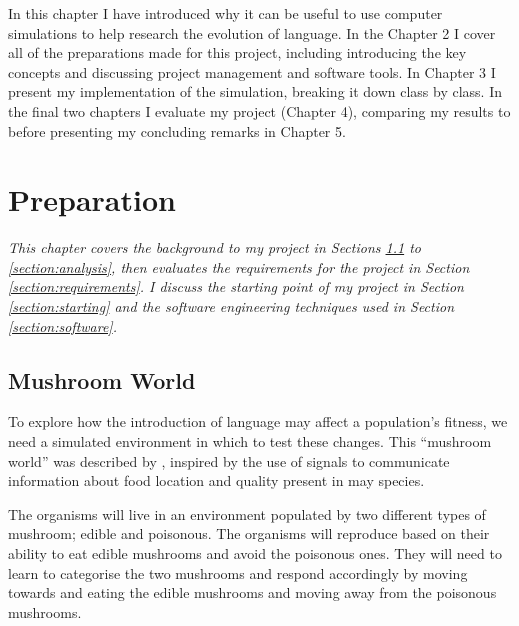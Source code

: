 \documentclass[12pt,a4paper,twoside,openright]{report}
\begin{document}
In this chapter I have introduced why it can be useful to use computer simulations to help research the evolution of language. In the Chapter 2 I cover all of the preparations made for this project, including introducing the key concepts and discussing project management and software tools. In Chapter 3 I present my implementation of the simulation, breaking it down class by class. In the final two chapters I evaluate my project (Chapter 4), comparing my results to \citet{Cangelosi1998} before presenting my concluding remarks in Chapter 5. 


\chapter{Preparation}\label{chapter:preparation}

\emph{This chapter covers the background to my project in Sections \ref{section:world} to \ref{section:analysis}, then evaluates the requirements for the project in Section \ref{section:requirements}. I discuss the starting point of my project in Section \ref{section:starting} and the software engineering techniques used in Section \ref{section:software}.}

\section{Mushroom World}\label{section:world}

To explore how the introduction of language may affect a population's fitness, we need a simulated environment in which to test these changes. This ``mushroom world'' was described by \cite{Cangelosi1998}, inspired by the use of signals to communicate information about food location and quality present in may species.

The organisms will live in an environment populated by two different types of mushroom; edible and poisonous. The organisms will reproduce based on their ability to eat edible mushrooms and avoid the poisonous ones. They will need to learn to categorise the two mushrooms and respond accordingly by moving towards and eating the edible mushrooms and moving away from the poisonous mushrooms.
\end{document}

